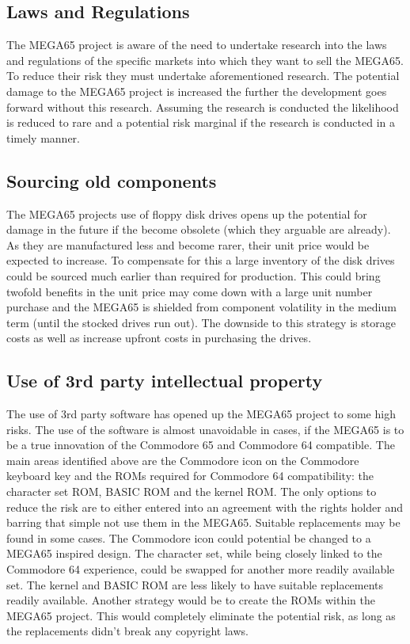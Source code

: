 \subsection{Laws and Regulations}
The MEGA65 project is aware of the need to undertake research into the laws and regulations of the specific markets into which they want to sell the MEGA65. To reduce their risk they must undertake aforementioned research. The potential damage to the MEGA65 project is increased the further the development goes forward without this research. Assuming the research is conducted the likelihood is reduced to rare and a potential risk marginal if the research is conducted in a timely manner.

\subsection{Sourcing old components}
The MEGA65 projects use of floppy disk drives opens up the potential for damage in the future if the become obsolete (which they arguable are already). As they are manufactured less and become rarer, their unit price would be expected to increase. To compensate for this a large inventory of the disk drives could be sourced much earlier than required for production. This could bring twofold benefits in the unit price may come down with a large unit number purchase and the MEGA65 is shielded from component volatility in the medium term (until the stocked drives run out). The downside to this strategy is storage costs as well as increase upfront costs in purchasing the drives.

\subsection{Use of 3rd party intellectual property}
The use of 3rd party software has opened up the MEGA65 project to some high risks. The use of the software is almost unavoidable in cases, if the MEGA65 is to be a true innovation of the Commodore 65 and Commodore 64 compatible. The main areas identified above are the Commodore icon on the Commodore keyboard key and the ROMs required for Commodore 64 compatibility: the character set ROM, BASIC ROM and the kernel ROM. The only options to reduce the risk are to either entered into an agreement with the rights holder and barring that simple not use them in the MEGA65. Suitable replacements may be found in some cases. The Commodore icon could potential be changed to a MEGA65 inspired design. The character set, while being closely linked to the Commodore 64 experience, could be swapped for another more readily available set. The kernel and BASIC ROM are less likely to have suitable replacements readily available. Another strategy would be to create the ROMs within the MEGA65 project. This would completely eliminate the potential risk, as long as the replacements didn't break any copyright laws. 

